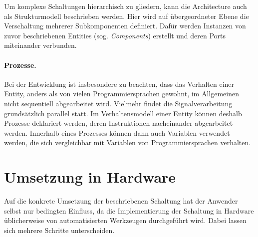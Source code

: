 Um komplexe Schaltungen hierarchisch zu gliedern, kann die Architecture auch als Strukturmodell beschrieben werden. Hier wird auf übergeordneter Ebene die Verschaltung mehrerer Subkomponenten definiert. Dafür werden Instanzen von zuvor beschriebenen Entities (sog. \textit{Components}) erstellt und deren Ports miteinander verbunden. \cite[S. 25ff.]{kesel2013entwurf}

\paragraph{Prozesse.} Bei der Entwicklung ist insbesondere zu beachten,
dass das Verhalten einer Entity, anders als von vielen
Programmiersprachen gewohnt, im Allgemeinen nicht sequentiell
abgearbeitet wird. Vielmehr findet die Signalverarbeitung grundsätzlich
parallel statt. Im Verhaltensmodell einer Entity können deshalb Prozesse
deklariert werden, deren Instruktionen nacheinander abgearbeitet werden. Innerhalb eines Prozesses können dann auch Variablen verwendet werden, die sich vergleichbar mit Variablen von Programmiersprachen verhalten. \cite[S. 29f.]{kesel2013entwurf}
 
\section{Umsetzung in Hardware}
Auf die konkrete Umsetzung der beschriebenen Schaltung hat der Anwender
selbst nur bedingten Einfluss, da die Implementierung der Schaltung in
Hardware üblicherweise von automatisierten Werkzeugen durchgeführt wird.
Dabei lassen sich mehrere Schritte unterscheiden. 

